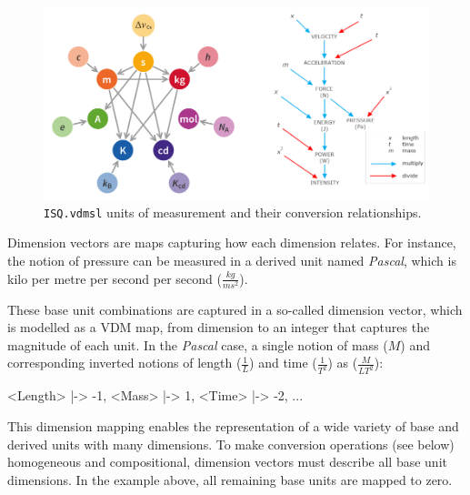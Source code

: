 \documentclass[runningheads,a4paper]{llncs}
\begin{document}
\begin{figure}[htbp]
    \centering
        \includegraphics[width=\textwidth,scale=0.4]{figures/ISQLibUnitRelationships2.png}
    \caption{\texttt{ISQ.vdmsl} units of measurement and their conversion relationships.}\label{fig:UnitRelationships}
 \end{figure}

Dimension vectors are maps capturing how each dimension relates. For instance, the notion of pressure can be measured in a derived unit named \textit{Pascal}, which is kilo per metre per second per second (\(\frac{kg}{ms^2}\)). 

These base unit combinations are captured in a so-called dimension vector, which is modelled as a VDM map, from dimension to an integer that captures the magnitude of each unit. In the \textit{Pascal} case, a single notion of mass (\(M\)) and corresponding inverted notions of length (\(\frac{1}{L}\)) and time (\(\frac{1}{T^2}\)) as (\(\frac{M}{LT^2}\)): 
%
\begin{vdmsl}[frame=none,basicstyle=\ttfamily\scriptsize]
    { <Length> |-> -1, <Mass> |-> 1, <Time> |-> -2, ... }
\end{vdmsl}   
%
\noindent This dimension mapping enables the representation of a wide variety of base and derived units with many dimensions. To make conversion operations (see below) homogeneous and compositional, dimension vectors must describe all base unit dimensions. In the example above, all remaining base units are mapped to zero.
\end{document}
